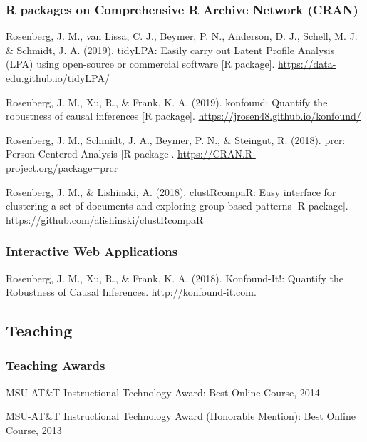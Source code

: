 \documentclass[14,]{article}
\begin{document}
\hypertarget{r-packages-on-comprehensive-r-archive-network-cran}{%
\subsubsection{R packages on Comprehensive R Archive Network
(CRAN)}\label{r-packages-on-comprehensive-r-archive-network-cran}}

Rosenberg, J. M., van Lissa, C. J., Beymer, P. N., Anderson, D. J.,
Schell, M. J. \& Schmidt, J. A. (2019). tidyLPA: Easily carry out Latent
Profile Analysis (LPA) using open-source or commercial software {[}R
package{]}. \url{https://data-edu.github.io/tidyLPA/}

Rosenberg, J. M., Xu, R., \& Frank, K. A. (2019). konfound: Quantify the
robustness of causal inferences {[}R package{]}.
\url{https://jrosen48.github.io/konfound/}

Rosenberg, J. M., Schmidt, J. A., Beymer, P. N., \& Steingut, R. (2018).
prcr: Person-Centered Analysis {[}R package{]}.
\url{https://CRAN.R-project.org/package=prcr}

Rosenberg, J. M., \& Lishinski, A. (2018). clustRcompaR: Easy interface
for clustering a set of documents and exploring group-based patterns
{[}R package{]}. \url{https://github.com/alishinski/clustRcompaR}

\hypertarget{interactive-web-applications}{%
\subsubsection{Interactive Web
Applications}\label{interactive-web-applications}}

Rosenberg, J. M., Xu, R., \& Frank, K. A. (2018). Konfound-It!: Quantify
the Robustness of Causal Inferences. \url{http://konfound-it.com}.

\hypertarget{teaching}{%
\subsection{Teaching}\label{teaching}}

\hypertarget{teaching-awards}{%
\subsubsection{Teaching Awards}\label{teaching-awards}}

MSU-AT\&T Instructional Technology Award: Best Online Course, 2014

MSU-AT\&T Instructional Technology Award (Honorable Mention): Best
Online Course, 2013
\end{document}
